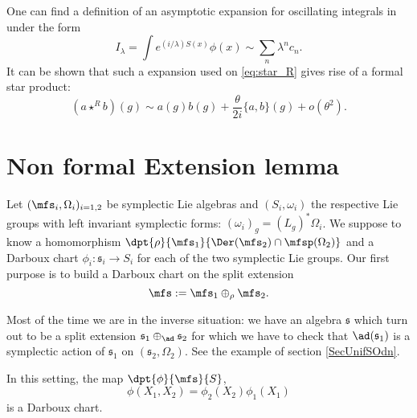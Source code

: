 One can  find a definition of an asymptotic expansion for oscillating integrals in \cite{Dieu7} under the form
\[
   I_{\lambda}=\int e^{(i/\lambda)S(x)}\phi(x)\sim\sum_n\lambda^nc_n.
\]
It can be shown that such a  expansion used on \eqref{eq:star_R} gives rise of a formal star product:
\begin{equation}    \label{EqDevFedFor}
(a\star^{R} b)(g)\sim a(g)b(g)+\frac{\theta}{2i}\{a,b\}(g)+o(\theta^2).
\end{equation}

\section{Non formal Extension lemma}        \label{SecExtLem}

Let $(\mfs_i,\Omega_i)_{i=1,2}$ be  symplectic Lie algebras and $(S_i,\omega_i)$ the respective Lie groups with left invariant symplectic forms: $(\omega_i)_g=(L_g)^*\Omega_i$. 
We suppose to know a homomorphism  $\dpt{\rho}{\mfs_1}{\Der(\mfs_2)\cap\mfsp(\Omega_2)}$ and a Darboux chart $\phi_i\colon \mathfrak{s}_i\to S_i$ for each of the two symplectic Lie groups. Our first purpose is to build a Darboux chart on the split extension
\[
   \mfs:=\mfs_1\oplus_{\rho}\mfs_2.
\]

\begin{remark}
Most of the time we are in the inverse situation: we have an algebra $\mathfrak{s}$ which turn out to be a split extension $\mathfrak{s}_{1}\oplus_{\ad}\mathfrak{s}_{2}$ for which we have to check that $\ad(\mathfrak{s}_{1})$ is a symplectic action of $\mathfrak{s}_{1}$ on $(\mathfrak{s}_{2},\Omega_{2})$. See the example of section \ref{SecUnifSOdn}.
\end{remark}
 
\begin{proposition}
In this setting, the map $\dpt{\phi}{\mfs}{S}$,
\begin{equation}
  \phi(X_1,X_2)=\phi_2(X_2)\phi_1(X_1)
\end{equation}
is a Darboux chart.
\label{prop:Darboux}
\end{proposition}

